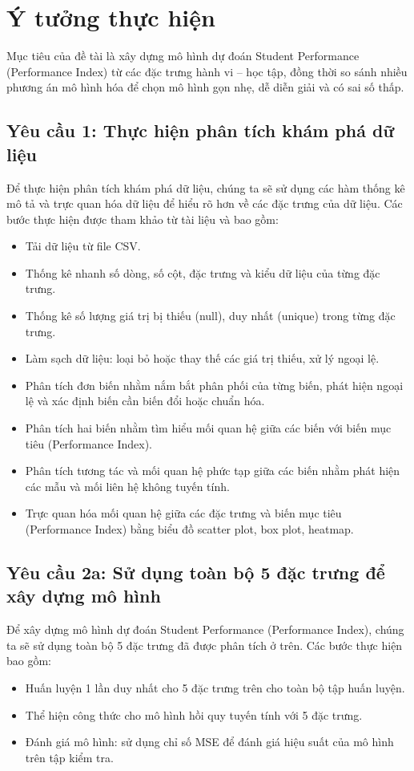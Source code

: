 \section{Ý tưởng thực hiện}
Mục tiêu của đề tài là xây dựng mô hình dự đoán Student Performance (Performance Index) từ các đặc trưng hành vi – học tập, đồng thời so sánh nhiều phương án mô hình hóa để chọn mô hình gọn nhẹ, dễ diễn giải và có sai số thấp.

\subsection{Yêu cầu 1: Thực hiện phân tích khám phá dữ liệu}
Để thực hiện phân tích khám phá dữ liệu, chúng ta sẽ sử dụng các hàm thống kê mô tả và trực quan hóa dữ liệu để hiểu rõ hơn về các đặc trưng của dữ liệu. Các bước thực hiện được tham khảo từ tài liệu \cite{EDA_purpose} và \cite{EDA_step_by_step} bao gồm:
\begin{itemize}
	\item Tải dữ liệu từ file CSV.
	\item Thống kê nhanh số dòng, số cột, đặc trưng và kiểu dữ liệu của từng đặc trưng.
	\item Thống kê số lượng giá trị bị thiếu (null), duy nhất (unique) trong từng đặc trưng.
	\item Làm sạch dữ liệu: loại bỏ hoặc thay thế các giá trị thiếu, xử lý ngoại lệ.
	\item Phân tích đơn biến nhằm nắm bắt phân phối của từng biến, phát hiện ngoại lệ và xác định biến cần biến đổi hoặc chuẩn hóa.
	\item Phân tích hai biến nhằm tìm hiểu mối quan hệ giữa các biến với biến mục tiêu (Performance Index).
	\item Phân tích tương tác và mối quan hệ phức tạp giữa các biến nhằm phát hiện các mẫu và mối liên hệ không tuyến tính.
	\item Trực quan hóa mối quan hệ giữa các đặc trưng và biến mục tiêu (Performance Index) bằng biểu đồ scatter plot, box plot, heatmap.
\end{itemize}

\subsection{Yêu cầu 2a: Sử dụng toàn bộ 5 đặc trưng để xây dựng mô hình}
Để xây dựng mô hình dự đoán Student Performance (Performance Index), chúng ta sẽ sử dụng toàn bộ 5 đặc trưng đã được phân tích ở trên. Các bước thực hiện bao gồm:
\begin{itemize}
	\item Huấn luyện 1 lần duy nhất cho 5 đặc trưng trên cho toàn bộ tập huấn luyện.
	\item Thể hiện công thức cho mô hình hồi quy tuyến tính với 5 đặc trưng.
	\item Đánh giá mô hình: sử dụng chỉ số MSE để đánh giá hiệu suất của mô hình trên tập kiểm tra.
\end{itemize}

